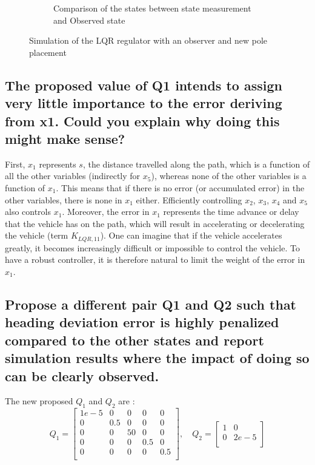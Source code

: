 \begin{figure}[H]
\begin{subfigure}[b]{0.95\textwidth}
         \caption{Comparison of the states between state measurement and Observed state}
         \label{fig:Obs}
     \end{subfigure}
    \caption{Simulation of the LQR regulator with an observer and new pole placement}
    \label{fig:sim}
\end{figure}

\subsection{The proposed value of Q1 intends to assign very little importance to the error deriving from x1. Could you explain why doing this might make sense?}

First, $x_1$ represents $s$, the distance travelled along the path, which is a function of all the other variables (indirectly for $x_5$), whereas none of the other variables is a function of $x_1$. This means that if there is no error (or accumulated error) in the other variables, there is none in $x_1$ either. Efficiently controlling $x_2$, $x_3$, $x_4$ and $x_5$ also controls $x_1$. Moreover, the error in $x_1$ represents the time advance or delay that the vehicle has on the path, which will result in accelerating or decelerating the vehicle (term $K_{LQR,11}$). One can imagine that if the vehicle accelerates greatly, it becomes increasingly difficult or impossible to control the vehicle. To have a robust controller, it is therefore natural to limit the weight of the error in $x_1$.



\subsection{Propose a different pair Q1 and Q2 such that heading deviation error is highly penalized compared to the other states and report simulation results where the impact of doing so can be clearly observed.}
The new proposed $Q_1$ and $Q_2$ are :
\begin{equation}
    Q_1 = 
    \left[ {\begin{array}{ccccc}
        1e-5 &0   &0   &0   &0     \\
        0    &0.5 &0   &0   &0     \\
        0    &0   &50  &0   &0     \\
        0    &0   &0   &0.5 &0     \\
        0    &0   &0   &0   &0.5   \\
    \end{array} } \right]    
    ,\quad
    Q_2 =
    \left[ {\begin{array}{cc}
        1 &0\\
        0 &2e-5\\
    \end{array} } \right]
\end{equation}

